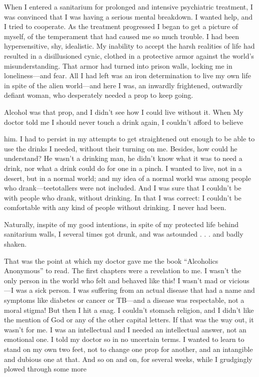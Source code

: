 \begin{biblechapter}
When I entered a sanitarium for prolonged and intensive psychiatric treatment, I was convinced that I was having a serious mental breakdown. I wanted help, and I tried to cooperate. As the treatment progressed I began to get a picture of myself, of the temperament that had caused me so much trouble. I had been hypersensitive, shy, idealistic. My inability to accept the harsh realities of life had resulted in a disillusioned cynic, clothed in a protective armor against the world’s misunderstanding. That armor had turned into prison walls, locking me in loneliness—and fear. All I had left was an iron determination to live my own life in spite of the alien world—and here I was, an inwardly frightened, outwardly defiant woman, who desperately needed a prop to keep going.

Alcohol was that prop, and I didn’t see how I could live without it. When My doctor told me I should never touch a drink again, I couldn’t afford to believe

him. I had to persist in my attempts to get straightened out enough to be able to use the drinks I needed, without their turning on me. Besides, how could he understand? He wasn’t a drinking man, he didn’t know what it was to need a drink, nor what a drink could do for one in a pinch. I wanted to live, not in a desert, but in a normal world; and my idea of a normal world was among people who drank—teetotallers were not included. And I was sure that I couldn’t be with people who drank, without drinking. In that I was correct: I couldn’t be comfortable with any kind of people without drinking. I never had been.

Naturally, inspite of my good intentions, in spite of my protected life behind sanitarium walls, I several times got drunk, and was astounded . . . and badly shaken.

That was the point at which my doctor gave me the book “Alcoholics Anonymous” to read. The first chapters were a revelation to me. I wasn’t the only person in the world who felt and behaved like this! I wasn’t mad or vicious—I was a sick person. I was suffering from an actual disease that had a name and symptoms like diabetes or cancer or TB—and a disease was respectable, not a moral stigma! But then I hit a snag. I couldn’t stomach religion, and I didn’t like the mention of God or any of the other capital letters. If that was the way out, it wasn’t for me. I was an intellectual and I needed an intellectual answer, not an emotional one. I told my doctor so in no uncertain terms. I wanted to learn to stand on my own two feet, not to change one prop for another, and an intangible and dubious one at that. And so on and on, for several weeks, while I grudgingly plowed through some more


\end{biblechapter}
